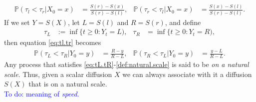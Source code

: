 \documentclass[12pt]{book}
\numberwithin{equation}{chapter}
\theoremstyle{plain}
\numberwithin{theorem}{section}
\theoremstyle{definition}
\numberwithin{exercise}{chapter}
\newcommand{\<}{\langle}
\renewcommand{\>}{\rangle}
\renewcommand{\(}{\left(}
\renewcommand{\)}{\right)}
\renewcommand{\[}{\left[}
\renewcommand{\]}{\right]}
\newcommand\Pb{\mathds{P}}
\newcommand\sig{\sigma}
\newcommand\dd{\mathrm{d}}
\newcommand{\blu}[1]{\textcolor{blue}{#1}}
\begin{document}
\begin{align}
\Pb( \tau_l < \tau_r | X_0 = x )
	&=	\frac{S(r) - S(x)}{S(r) - S(l)} , &
\Pb( \tau_r < \tau_l | X_0 = x )
	&=	\frac{S(x) - S(l)}{S(r) - S(l)} . \label{eq:tl.tr}
\end{align}
If we set $Y = S(X)$, let $L = S(l)$ and $R = S(r)$, and define
\begin{align}
\tau_L
	&:=	\inf\{ t \geq 0 : Y_t = L ) , &
\tau_R
	&=	\inf\{ t \geq 0 : Y_t = R ) , \label{eq:tL.tR}
\end{align}
then equation \eqref{eq:tl.tr} becomes
\begin{align}
\Pb( \tau_L < \tau_R | Y_0 = y )
	&=	\frac{R - y}{R - L} , &
\Pb( \tau_R < \tau_L | Y_0 = y )
	&=	\frac{y - L}{R - L} . \label{def:natural.scale}
\end{align}
Any process that satisfies \eqref{eq:tL.tR}-\eqref{def:natural.scale} is said to be \textit{on a natural scale}.  Thus, given a scalar diffusion $X$ we can always associate with it a diffusion $S(X)$ that is on a natural scale. 
\\[0.5em]
\blu{To do: meaning of \textit{speed}.}


\end{document}
